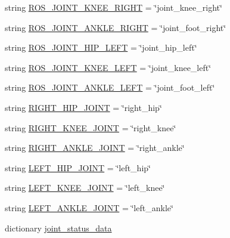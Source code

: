 \begin{DoxyCompactItemize}
string \mbox{\hyperlink{namespacevelocity__test_a341ef55c2d279578af17efe8637ddd03}{R\+O\+S\+\_\+\+J\+O\+I\+N\+T\+\_\+\+K\+N\+E\+E\+\_\+\+R\+I\+G\+HT}} = \char`\"{}joint\+\_\+knee\+\_\+right\char`\"{}
\item 
string \mbox{\hyperlink{namespacevelocity__test_ac17433d39b722537abc908a86e6ea99a}{R\+O\+S\+\_\+\+J\+O\+I\+N\+T\+\_\+\+A\+N\+K\+L\+E\+\_\+\+R\+I\+G\+HT}} = \char`\"{}joint\+\_\+foot\+\_\+right\char`\"{}
\item 
string \mbox{\hyperlink{namespacevelocity__test_a3a973375089949e40ace5139a851cedb}{R\+O\+S\+\_\+\+J\+O\+I\+N\+T\+\_\+\+H\+I\+P\+\_\+\+L\+E\+FT}} = \char`\"{}joint\+\_\+hip\+\_\+left\char`\"{}
\item 
string \mbox{\hyperlink{namespacevelocity__test_a7f0880da1f093ba95faeec7806a42256}{R\+O\+S\+\_\+\+J\+O\+I\+N\+T\+\_\+\+K\+N\+E\+E\+\_\+\+L\+E\+FT}} = \char`\"{}joint\+\_\+knee\+\_\+left\char`\"{}
\item 
string \mbox{\hyperlink{namespacevelocity__test_a8cd4a0f4646759c98455ab588430e2a5}{R\+O\+S\+\_\+\+J\+O\+I\+N\+T\+\_\+\+A\+N\+K\+L\+E\+\_\+\+L\+E\+FT}} = \char`\"{}joint\+\_\+foot\+\_\+left\char`\"{}
\item 
string \mbox{\hyperlink{namespacevelocity__test_a6d042ad31d4dd8b1196944ddd3f183dc}{R\+I\+G\+H\+T\+\_\+\+H\+I\+P\+\_\+\+J\+O\+I\+NT}} = \char`\"{}right\+\_\+hip\char`\"{}
\item 
string \mbox{\hyperlink{namespacevelocity__test_aac10175d78187fb4808713f5360621e6}{R\+I\+G\+H\+T\+\_\+\+K\+N\+E\+E\+\_\+\+J\+O\+I\+NT}} = \char`\"{}right\+\_\+knee\char`\"{}
\item 
string \mbox{\hyperlink{namespacevelocity__test_a9a87ce10dc7e9c95212b9394d3abc94d}{R\+I\+G\+H\+T\+\_\+\+A\+N\+K\+L\+E\+\_\+\+J\+O\+I\+NT}} = \char`\"{}right\+\_\+ankle\char`\"{}
\item 
string \mbox{\hyperlink{namespacevelocity__test_a72b898fa35ef82136e0f848309730045}{L\+E\+F\+T\+\_\+\+H\+I\+P\+\_\+\+J\+O\+I\+NT}} = \char`\"{}left\+\_\+hip\char`\"{}
\item 
string \mbox{\hyperlink{namespacevelocity__test_a456e70c0db66db9da24b1af04763749d}{L\+E\+F\+T\+\_\+\+K\+N\+E\+E\+\_\+\+J\+O\+I\+NT}} = \char`\"{}left\+\_\+knee\char`\"{}
\item 
string \mbox{\hyperlink{namespacevelocity__test_a6a8b8efc455f4e0b1bea0fcdd5fd576d}{L\+E\+F\+T\+\_\+\+A\+N\+K\+L\+E\+\_\+\+J\+O\+I\+NT}} = \char`\"{}left\+\_\+ankle\char`\"{}
\item 
dictionary \mbox{\hyperlink{namespacevelocity__test_adedb8acaa09e634a0127c67ad61a001b}{joint\+\_\+status\+\_\+data}}
\end{DoxyCompactItemize}


